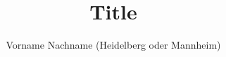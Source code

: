 \documentclass{beamer}
\title{Title}
\author{Vorname Nachname (Heidelberg oder Mannheim)}
\begin{document}
\begin{frame}
\maketitle
\end{frame}
\end{document}
